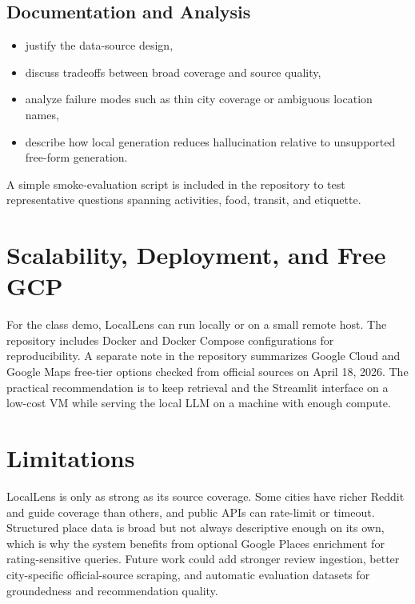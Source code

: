 \documentclass[11pt]{article}
\begin{document}
\subsection*{Documentation and Analysis}
\begin{itemize}[leftmargin=*]
    \item justify the data-source design,
    \item discuss tradeoffs between broad coverage and source quality,
    \item analyze failure modes such as thin city coverage or ambiguous location names,
    \item describe how local generation reduces hallucination relative to unsupported free-form generation.
\end{itemize}

A simple smoke-evaluation script is included in the repository to test representative questions spanning activities, food, transit, and etiquette.

\section{Scalability, Deployment, and Free GCP}
For the class demo, LocalLens can run locally or on a small remote host. The repository includes Docker and Docker Compose configurations for reproducibility. A separate note in the repository summarizes Google Cloud and Google Maps free-tier options checked from official sources on April 18, 2026. The practical recommendation is to keep retrieval and the Streamlit interface on a low-cost VM while serving the local LLM on a machine with enough compute.

\section{Limitations}
LocalLens is only as strong as its source coverage. Some cities have richer Reddit and guide coverage than others, and public APIs can rate-limit or timeout. Structured place data is broad but not always descriptive enough on its own, which is why the system benefits from optional Google Places enrichment for rating-sensitive queries. Future work could add stronger review ingestion, better city-specific official-source scraping, and automatic evaluation datasets for groundedness and recommendation quality.
\end{document}
